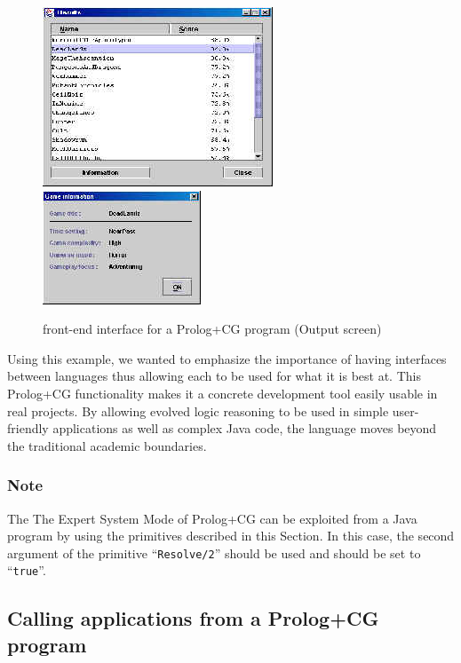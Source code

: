 \documentclass{book}
\begin{document}
\begin{htmlonly}

\begin{figure}
\begin{center}
\includegraphics{Prolog2.jpg}\includegraphics{Prolog3.jpg}
\end{center}
\caption{\label{Fig:OutputScreen}front-end interface for a Prolog+CG
program (Output screen)}
\end{figure}

\end{htmlonly}



Using this example, we wanted to emphasize the importance of having
interfaces between languages thus allowing each to be used for what it
is best at. This Prolog+CG functionality makes it a concrete
development tool easily usable in real projects. By allowing evolved
logic reasoning to be used in simple user-friendly applications as
well as complex Java code, the language moves beyond the traditional
academic boundaries.

\subsubsection{Note}

The The Expert System Mode of Prolog+CG can be exploited from a Java
program by using the primitives described in this Section. In this
case, the second argument of the primitive ``\texttt{Resolve/2}''
should be used and should be set to ``\texttt{true}''.



\subsection{Calling applications from a Prolog+CG program}
\end{document}
